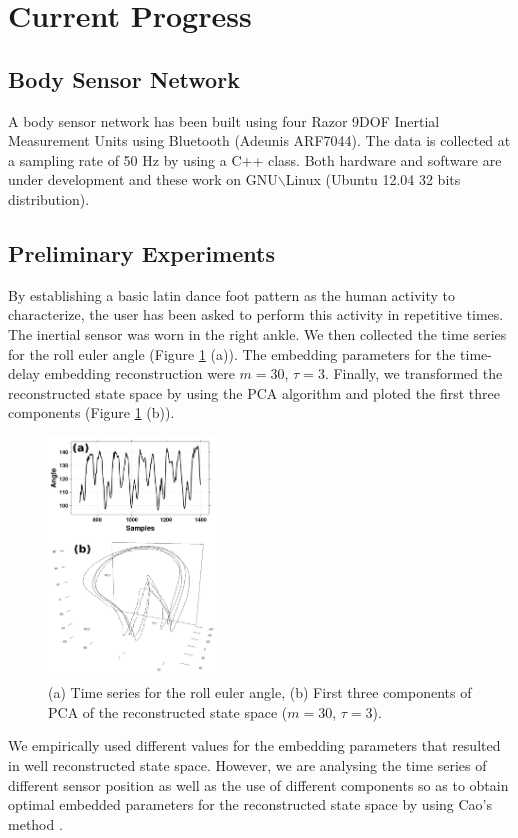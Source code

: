 \documentclass{sigchi}
\begin{document}
\section{Current Progress}

\subsection{Body Sensor Network}
A body sensor network has been built using four Razor 9DOF Inertial Measurement 
Units using Bluetooth (Adeunis ARF7044).
The data is collected at a sampling rate of 50 Hz by using a C++ class. 
Both hardware and software are under development and these work on 
GNU$\backslash$Linux (Ubuntu 12.04 32 bits distribution).

\subsection{Preliminary Experiments}
By establishing a basic latin dance foot pattern as the human activity to characterize,
the user has been asked to perform this activity in repetitive times. 
The inertial sensor was worn in the right ankle.
We then collected the time series for the roll euler angle 
(Figure \ref{fig:example} (a)). 
The embedding parameters for the time-delay embedding reconstruction 
were $m=30$, $\tau=3$. Finally, we transformed the reconstructed state space
by using the PCA algorithm and ploted the first three components
(Figure \ref{fig:example} (b)).
\begin{figure}[htbp!] 
\centering    
\includegraphics[width=0.4\textwidth]{experiments_v0}
\caption[PA]{(a) Time series for the roll euler angle, (b) 
First three components of PCA of the reconstructed state space ($m=30$, $\tau=3$).}
\label{fig:example}
\end{figure}
We empirically used different values for the embedding parameters 
that resulted in well reconstructed state space.
However, we are analysing the time series of different sensor position as well as 
the use of different components so as to obtain optimal embedded parameters
for the reconstructed state space by using Cao's method \cite{Cao1997}.
\end{document}
